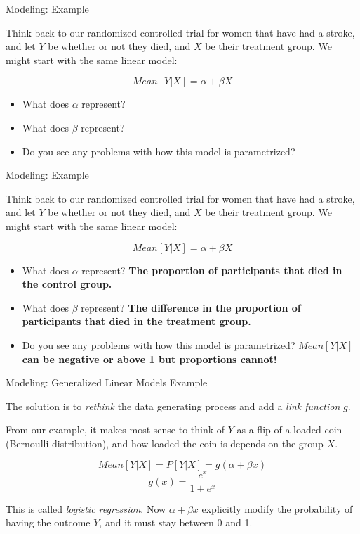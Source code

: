 \documentclass[ignorenonframetext,]{beamer}
\providecommand{\tightlist}{%
  \setlength{\itemsep}{0pt}\setlength{\parskip}{0pt}}
\begin{document}
\begin{frame}{Modeling: Example}
\protect\hypertarget{modeling-example}{}

Think back to our randomized controlled trial for women that have had a
stroke, and let \(Y\) be whether or not they died, and \(X\) be their
treatment group. We might start with the same linear model:

\[
Mean[Y|X] = \alpha + \beta X
\]

\begin{itemize}
\tightlist
\item
  What does \(\alpha\) represent?
\item
  What does \(\beta\) represent?
\item
  Do you see any problems with how this model is parametrized?
\end{itemize}

\end{frame}

\begin{frame}{Modeling: Example}
\protect\hypertarget{modeling-example-1}{}

Think back to our randomized controlled trial for women that have had a
stroke, and let \(Y\) be whether or not they died, and \(X\) be their
treatment group. We might start with the same linear model:

\[
Mean[Y|X] = \alpha + \beta X
\]

\begin{itemize}
\tightlist
\item
  What does \(\alpha\) represent? \textbf{The proportion of participants
  that died in the control group.}
\item
  What does \(\beta\) represent? \textbf{The difference in the
  proportion of participants that died in the treatment group.}
\item
  Do you see any problems with how this model is parametrized?
  \textbf{\(Mean[Y|X]\) can be negative or above 1 but proportions
  cannot!}
\end{itemize}

\end{frame}

\begin{frame}{Modeling: Generalized Linear Models Example}
\protect\hypertarget{modeling-generalized-linear-models-example}{}

The solution is to \emph{rethink} the data generating process and add a
\emph{link function} \(g\).

From our example, it makes most sense to think of \(Y\) as a flip of a
loaded coin (Bernoulli distribution), and how loaded the coin is depends
on the group \(X\).

\[
Mean[Y|X] = P[Y|X] = g(\alpha + \beta x)
\] \[
g(x) = \frac{e^{x}}{1 + e^{x}}
\]

This is called \emph{logistic regression}. Now \(\alpha + \beta x\)
explicitly modify the probability of having the outcome \(Y\), and it
must stay between 0 and 1.

\end{frame}
\end{document}
